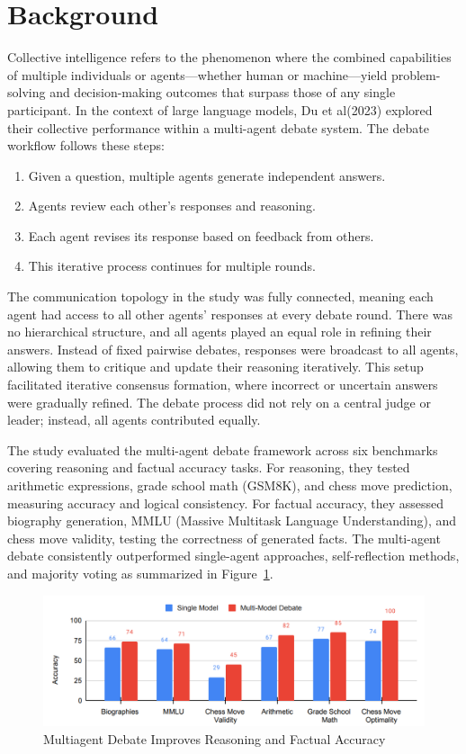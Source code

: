 \section{Background}
\label{sec:background}

Collective intelligence refers to the phenomenon where the combined capabilities of multiple individuals or agents—whether human or machine—yield problem-solving and decision-making outcomes that surpass those of any single participant. In the context of large language models, Du et al(2023)\cite{du2023improvingfactualityreasoninglanguage} explored their collective performance within a multi-agent debate system. The debate workflow follows these steps:
\begin{enumerate}
\item Given a question, multiple agents generate independent answers.
\item Agents review each other’s responses and reasoning.
\item Each agent revises its response based on feedback from others.
\item This iterative process continues for multiple rounds.
\end{enumerate}

The communication topology in the study was fully connected, meaning each agent had access to all other agents’ responses at every debate round. There was no hierarchical structure, and all agents played an equal role in refining their answers. Instead of fixed pairwise debates, responses were broadcast to all agents, allowing them to critique and update their reasoning iteratively. This setup facilitated iterative consensus formation, where incorrect or uncertain answers were gradually refined. The debate process did not rely on a central judge or leader; instead, all agents contributed equally.

The study evaluated the multi-agent debate framework across six benchmarks covering reasoning and factual accuracy tasks. For reasoning, they tested arithmetic expressions, grade school math (GSM8K), and chess move prediction, measuring accuracy and logical consistency. For factual accuracy, they assessed biography generation, MMLU (Massive Multitask Language Understanding), and chess move validity, testing the correctness of generated facts. The multi-agent debate consistently outperformed single-agent approaches, self-reflection methods, and majority voting as summarized in Figure~\ref{fig:multiagent}.
\begin{figure}
    \centering
    \includegraphics[width=1\linewidth]{img/section_background/multi-agent-debate-result.png}
    \caption{{Multiagent Debate Improves Reasoning and Factual Accuracy}}
    \label{fig:multiagent}
\end{figure}

